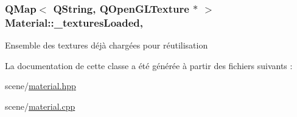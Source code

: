\hypertarget{class_material_a9f91b9fda835fed049df5c6959043623}{
\subsubsection[{\+\_\+textures\+Loaded}]{\setlength{\rightskip}{0pt plus 5cm}Q\+Map$<$ Q\+String, Q\+Open\+G\+L\+Texture $\ast$ $>$ Material\+::\+\_\+textures\+Loaded\hspace{0.3cm}{\ttfamily [static]}, {\ttfamily [private]}}}\label{class_material_a9f91b9fda835fed049df5c6959043623}
Ensemble des textures déjà chargées pour réutilisation 

La documentation de cette classe a été générée à partir des fichiers suivants \+:\begin{DoxyCompactItemize}
\item 
scene/\hyperlink{material_8hpp}{material.\+hpp}\item 
scene/\hyperlink{material_8cpp}{material.\+cpp}\end{DoxyCompactItemize}
